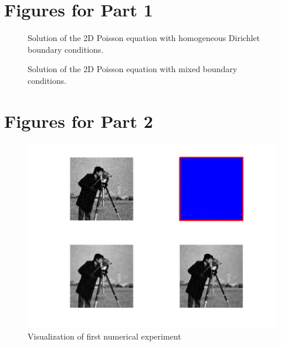 \documentclass{report}
\begin{document}


\appendix

\chapter{Figures for Part 1}

\begin{figure}
	\caption{Solution of the 2D Poisson equation with homogeneous Dirichlet boundary conditions.}
	\label{vis:2dpoissondir}
\end{figure}

\begin{figure}
	\caption{Solution of the 2D Poisson equation with mixed boundary conditions.}
	\label{vis:2dpoissonneu}
\end{figure}

\chapter{Figures for Part 2}

\begin{figure}
	\centering
	\includegraphics[width=\textwidth]{../out/report_firsttry.png}
	\caption{Visualization of first numerical experiment}
	\label{vis:firsttry}
\end{figure}
\end{document}
